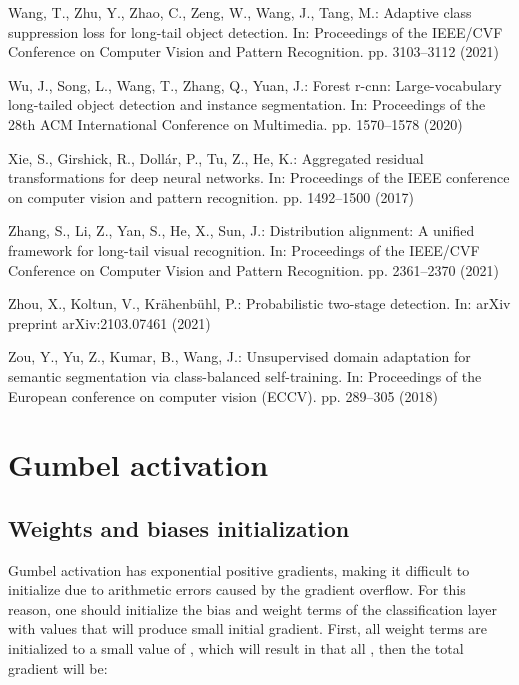 \documentclass[runningheads]{llncs}
\begin{document}
\begin{thebibliography}{10}
Wang, T., Zhu, Y., Zhao, C., Zeng, W., Wang, J., Tang, M.: Adaptive class
  suppression loss for long-tail object detection. In: Proceedings of the
  IEEE/CVF Conference on Computer Vision and Pattern Recognition. pp.
  3103--3112 (2021)

Wu, J., Song, L., Wang, T., Zhang, Q., Yuan, J.: Forest r-cnn: Large-vocabulary
  long-tailed object detection and instance segmentation. In: Proceedings of
  the 28th ACM International Conference on Multimedia. pp. 1570--1578 (2020)

Xie, S., Girshick, R., Doll{\'a}r, P., Tu, Z., He, K.: Aggregated residual
  transformations for deep neural networks. In: Proceedings of the IEEE
  conference on computer vision and pattern recognition. pp. 1492--1500 (2017)

Zhang, S., Li, Z., Yan, S., He, X., Sun, J.: Distribution alignment: A unified
  framework for long-tail visual recognition. In: Proceedings of the IEEE/CVF
  Conference on Computer Vision and Pattern Recognition. pp. 2361--2370 (2021)

Zhou, X., Koltun, V., Kr{\"a}henb{\"u}hl, P.: Probabilistic two-stage
  detection. In: arXiv preprint arXiv:2103.07461 (2021)

Zou, Y., Yu, Z., Kumar, B., Wang, J.: Unsupervised domain adaptation for
  semantic segmentation via class-balanced self-training. In: Proceedings of
  the European conference on computer vision (ECCV). pp. 289--305 (2018)

\end{thebibliography}
\clearpage
\appendix


\section{Gumbel activation}
\label{gumbel_details}
\subsection{Weights and biases initialization}
Gumbel activation has exponential positive gradients, making it difficult to initialize due to arithmetic errors caused by the gradient overflow. For this reason, one should initialize the bias and weight terms of the classification layer with values that will produce small initial gradient. First, all weight terms  are initialized to a small value of , which will result in that all , then the total gradient will be:
\end{document}

